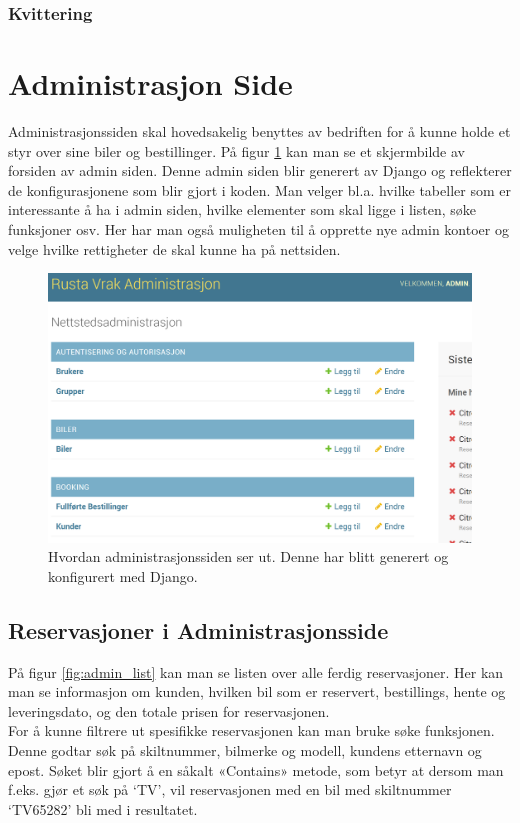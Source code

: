 \subsubsection{Kvittering}






\clearpage
\section{Administrasjon Side}
Administrasjonssiden skal hovedsakelig benyttes av bedriften for å kunne holde et styr over sine biler og bestillinger. På figur \ref{fig:admin_front} kan man se et skjermbilde av forsiden av admin siden. Denne admin siden blir generert av Django og reflekterer de konfigurasjonene som blir gjort i koden. Man velger bl.a. hvilke tabeller som er interessante å ha i admin siden, hvilke elementer som skal ligge i listen, søke funksjoner osv. Her har man også muligheten til å opprette nye admin kontoer og velge hvilke rettigheter de skal kunne ha på nettsiden.

 \begin{figure}[htbp]
	\centering
		\includegraphics[scale=0.3]{Bilder/admin_forside.png}
	\caption[Forside i Administrasjons Side]{Hvordan administrasjonssiden ser ut. Denne har blitt generert og konfigurert med Django. } %
	\label{fig:admin_front}
\end{figure}
\newpage
\subsection{Reservasjoner i Administrasjonsside}
På figur \ref{fig:admin_list} kan man se listen over alle ferdig reservasjoner. Her kan man se informasjon om kunden, hvilken bil som er reservert, bestillings, hente og leveringsdato, og den totale prisen for reservasjonen. \\
For å kunne filtrere ut spesifikke reservasjonen kan man bruke søke funksjonen. Denne godtar søk på skiltnummer, bilmerke og modell, kundens etternavn og epost. Søket blir gjort å en såkalt «Contains» metode, som betyr at dersom man f.eks. gjør et søk på ‘TV’, vil reservasjonen med en bil med skiltnummer ‘TV65282’ bli med i resultatet.

